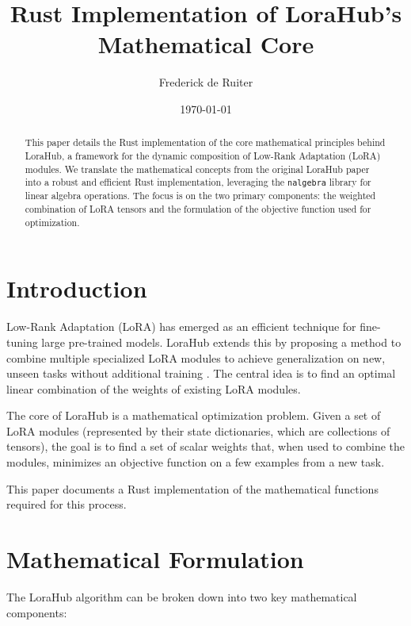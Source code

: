 \documentclass[12pt]{article}
\title{Rust Implementation of LoraHub's Mathematical Core}
\author{Frederick de Ruiter}
\date{\today}
\begin{document}
\maketitle

\begin{abstract}
    This paper details the Rust implementation of the core mathematical principles behind LoraHub, a framework for the dynamic composition of Low-Rank Adaptation (LoRA) modules. We translate the mathematical concepts from the original LoraHub paper into a robust and efficient Rust implementation, leveraging the \texttt{nalgebra} library for linear algebra operations. The focus is on the two primary components: the weighted combination of LoRA tensors and the formulation of the objective function used for optimization.
\end{abstract}

\section{Introduction}

Low-Rank Adaptation (LoRA) has emerged as an efficient technique for fine-tuning large pre-trained models. LoraHub extends this by proposing a method to combine multiple specialized LoRA modules to achieve generalization on new, unseen tasks without additional training \cite{huang2023lorahub}. The central idea is to find an optimal linear combination of the weights of existing LoRA modules.

The core of LoraHub is a mathematical optimization problem. Given a set of LoRA modules (represented by their state dictionaries, which are collections of tensors), the goal is to find a set of scalar weights that, when used to combine the modules, minimizes an objective function on a few examples from a new task.

This paper documents a Rust implementation of the mathematical functions required for this process.

\section{Mathematical Formulation}

The LoraHub algorithm \cite{huang2023lorahub} can be broken down into two key mathematical components:
\end{document}
